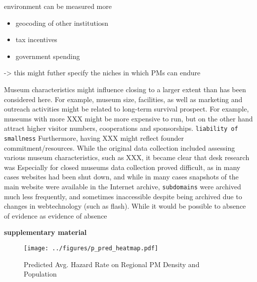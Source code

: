 \documentclass[12pt]{article}
\begin{document}
environment can be measured more
\begin{itemize}
\item geocoding of other institutiosn
\item tax incentives
\item government spending
\end{itemize}
-> this might futher specify the niches in which PMs can endure


Museum characteristics might influence closing to a larger extent than has been considered here.
For example, museum size, facilities, as well as marketing and outreach activities might be related to long-term survival prospect.
For example, museums with more XXX might be more expensive to run, but on the other hand attract higher visitor numbers, cooperations and sponsorships. \texttt{liability of smallness}
Furthermore, having XXX might reflect founder commitment/resources.
While the original data collection included assessing various museum characteristics, such as XXX, it became clear that desk research was
Especially for closed museums data collection proved difficult, as in many cases websites had been shut down, and while in many cases snapshots of the main website were available in the Internet archive, \texttt{subdomains} were archived much less frequently, and sometimes inaccessible despite being archived due to changes in webtechnology (such as flash).
While it would be possible to
absence of evidence as evidence of absence

\textbf{supplementary material}




\begin{figure}[htbp]
\centering
\texttt{[image: ../figures/p\_pred\_heatmap.pdf]}
\caption{\label{fig:p_pred_heatmap}Predicted Avg. Hazard Rate on Regional PM Density and Population}
\end{figure}
\end{document}
